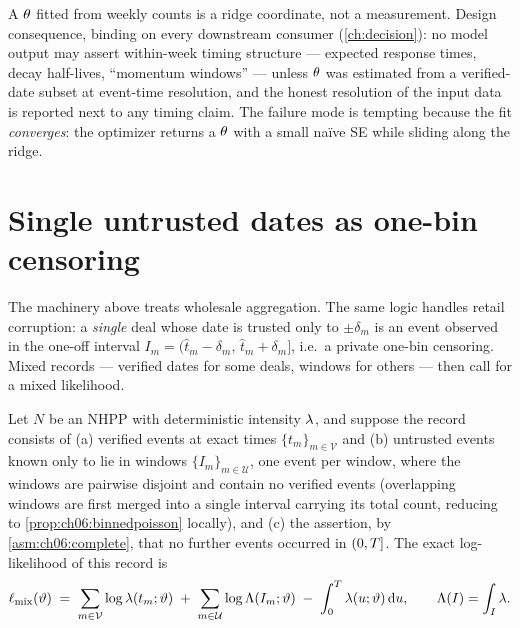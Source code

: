 \begin{warning}\label{warn:ch06:timingclaims}
A $\theta$ fitted from weekly counts is a ridge coordinate, not a
measurement. Design consequence, binding on every downstream consumer
(\cref{ch:decision}): no model output may assert within-week timing
structure --- expected response times, decay half-lives, ``momentum
windows'' --- unless $\theta$ was estimated from a verified-date subset at
event-time resolution, and the honest resolution of the input data is
reported next to any timing claim. The failure mode is tempting because
the fit \emph{converges}: the optimizer returns a $\theta$ with a small
na\"ive SE while sliding along the ridge.
\end{warning}

\section{Single untrusted dates as one-bin censoring}\label{ch06:sec:onebin}

The machinery above treats wholesale aggregation. The same logic handles
retail corruption: a \emph{single} deal whose date is trusted only to
$\pm\delta_m$ is an event observed in the one-off interval
$I_m = (\hat t_m - \delta_m,\, \hat t_m + \delta_m]$, i.e.\ a private
one-bin censoring. Mixed records --- verified dates for some deals,
windows for others --- then call for a mixed likelihood.

\begin{proposition}\label{prop:ch06:mixedpoisson}
Let $N$ be an NHPP with deterministic intensity $\lambda$, and suppose the
record consists of (a) verified events at exact times
$\{t_m\}_{m\in\mathcal{V}}$ and (b) untrusted events known only to lie in
windows $\{I_m\}_{m\in\mathcal{U}}$, one event per window, where the
windows are pairwise disjoint and contain no verified events (overlapping
windows are first merged into a single interval carrying its total count,
reducing to \cref{prop:ch06:binnedpoisson} locally), and (c) the assertion,
by \cref{asm:ch06:complete}, that no further events occurred in
$(0,T]$. The exact log-likelihood of this record is
\begin{equation}\label{eq:ch06:mixed}
\ell_{\mathrm{mix}}(\vartheta)
 \;=\;
 \sum_{m\in\mathcal{V}} \log\lambda(t_m;\vartheta)
 \;+\;
 \sum_{m\in\mathcal{U}} \log \Lambda(I_m;\vartheta)
 \;-\;
 \int_0^{T}\lambda(u;\vartheta)\,\mathrm{d} u,
\qquad
\Lambda(I) = \int_I \lambda .
\end{equation}
\end{proposition}

